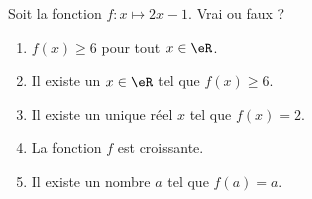 
\begin{exercice}\label{exosmath-0135}

    Soit la fonction \( f\colon x\mapsto 2x-1\). Vrai ou faux ?
    \begin{enumerate}
        \item
            \( f(x)\geq 6\) pour tout \( x\in \eR\).
        \item
            Il existe un \( x\in \eR\) tel que \( f(x)\geq 6\).
        \item
            Il existe un unique réel \( x\) tel que \( f(x)=2\).
        \item
            La fonction \( f\) est croissante.
        \item
            Il existe un nombre \( a\) tel que \( f(a)=a\).
    \end{enumerate}

\end{exercice}
